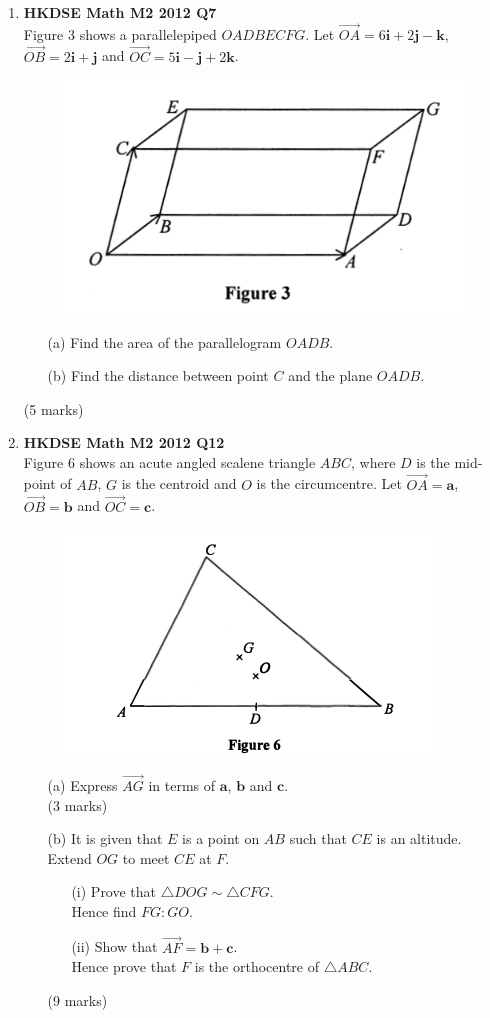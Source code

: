 \documentclass{report}
\begin{document}
\begin{enumerate}
	\item \textbf{HKDSE Math M2 2012 Q7}\\
	Figure 3 shows a parallelepiped $OADBECFG$. Let $\overrightarrow{OA} = 6\textbf{i} +2\textbf{j} -\textbf{k}$, $\overrightarrow{OB} = 2\textbf{i} +\textbf{j} $ and $\overrightarrow{OC} = 5\textbf{i} -\textbf{j} +2\textbf{k}$.
	\begin{figure}[H]
		\centering
		\includegraphics[width = .4\linewidth]{2012Figure3}
	\end{figure}
	\begin{enumerate}
		\item [(a)]Find the area of the parallelogram $OADB$. 
		\item [(b)]Find the distance between point $C$ and the plane $OADB$.
	\end{enumerate}
	(5 marks)

	\item \textbf{HKDSE Math M2 2012 Q12}\\
	Figure 6 shows an acute angled scalene triangle $ABC$, where $D$ is the mid-point of $AB$, $G$ is the centroid and $O$ is the circumcentre. Let $\overrightarrow{OA} = \textbf{a}$, $\overrightarrow{OB} = \textbf{b}$ and $\overrightarrow{OC} = \textbf{c}$.
	\begin{figure}[H]
		\centering
		\includegraphics[width = .5\linewidth]{2012Figure6}
	\end{figure}
	\begin{enumerate}
		\item [(a)]Express $\overrightarrow{AG}$ in terms of $\textbf{a}$, $\textbf{b}$ and $\textbf{c}$.\\(3 marks)
		\item [(b)]It is given that $E$ is a point on $AB$ such that $CE$ is an altitude. Extend $OG$ to meet $CE$ at $F$. 
		\begin{enumerate}
			\item [(i)]Prove that $\triangle DOG \sim \triangle CFG$. \\
			Hence find $FG:GO$. 
			\item [(ii)]Show that $\overrightarrow{AF} = \textbf{b} + \textbf{c}$. \\
			Hence prove that $F$ is the orthocentre of $\triangle ABC$.
		\end{enumerate}
		(9 marks)
	\end{enumerate}
	

\end{enumerate}
\end{document}
